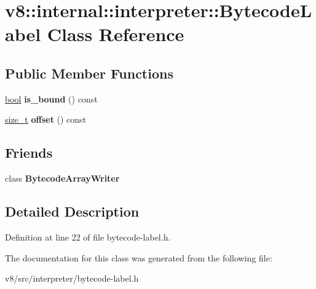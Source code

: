 \hypertarget{classv8_1_1internal_1_1interpreter_1_1BytecodeLabel}{}\section{v8\+:\+:internal\+:\+:interpreter\+:\+:Bytecode\+Label Class Reference}
\label{classv8_1_1internal_1_1interpreter_1_1BytecodeLabel}
\subsection*{Public Member Functions}
\begin{DoxyCompactItemize}
\item 
\mbox{\label{classv8_1_1internal_1_1interpreter_1_1BytecodeLabel_a712d525a7f151a48d41c2c44fc1913c1}} 
\mbox{\hyperlink{classbool}{bool}} {\bfseries is\+\_\+bound} () const
\item 
\mbox{\label{classv8_1_1internal_1_1interpreter_1_1BytecodeLabel_afb967c4f4b9c43312c0ab93f50a5a062}} 
\mbox{\hyperlink{classsize__t}{size\+\_\+t}} {\bfseries offset} () const
\end{DoxyCompactItemize}
\subsection*{Friends}
\begin{DoxyCompactItemize}
\item 
\mbox{\label{classv8_1_1internal_1_1interpreter_1_1BytecodeLabel_aab2e7c63f9c786abf0fed26deb945c2c}} 
class {\bfseries Bytecode\+Array\+Writer}
\end{DoxyCompactItemize}


\subsection{Detailed Description}


Definition at line 22 of file bytecode-\/label.\+h.



The documentation for this class was generated from the following file\+:\begin{DoxyCompactItemize}
\item 
v8/src/interpreter/bytecode-\/label.\+h\end{DoxyCompactItemize}
